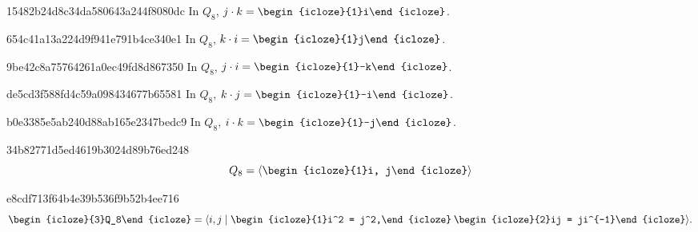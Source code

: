 \begin{note}{15482b24d8c34da580643a244f8080dc}
    In \({ Q_8 }\), \quad
    \({ j \cdot k = \begin{icloze}{1}i\end{icloze} }\).
\end{note}

\begin{note}{654c41a13a224d9f941e791b4ce340e1}
    In \({ Q_8 }\), \quad
    \({ k \cdot i = \begin{icloze}{1}j\end{icloze} }\).
\end{note}

\begin{note}{9be42c8a75764261a0ec49fd8d867350}
    In \({ Q_8 }\), \quad
    \({ j \cdot i = \begin{icloze}{1}-k\end{icloze} }\).
\end{note}

\begin{note}{de5cd3f588fd4c59a098434677b65581}
    In \({ Q_8 }\), \quad
    \({ k \cdot j = \begin{icloze}{1}-i\end{icloze} }\).
\end{note}

\begin{note}{b0e3385e5ab240d88ab165e2347bedc9}
    In \({ Q_8 }\), \quad
    \({ i \cdot k = \begin{icloze}{1}-j\end{icloze} }\).
\end{note}

\begin{note}{34b82771d5ed4619b3024d89b76ed248}
    \[
        Q_8 = \langle \begin{icloze}{1}i, j\end{icloze} \rangle
    \]
\end{note}

\begin{note}{e8cdf713f64b4e39b536f9b52b4ee716}
    \[
        \begin{icloze}{3}Q_8\end{icloze} = \langle i, j \mid \begin{icloze}{1}i^2 = j^2,\end{icloze}\: \begin{icloze}{2}ij = ji^{-1}\end{icloze} \rangle.
    \]
\end{note}


